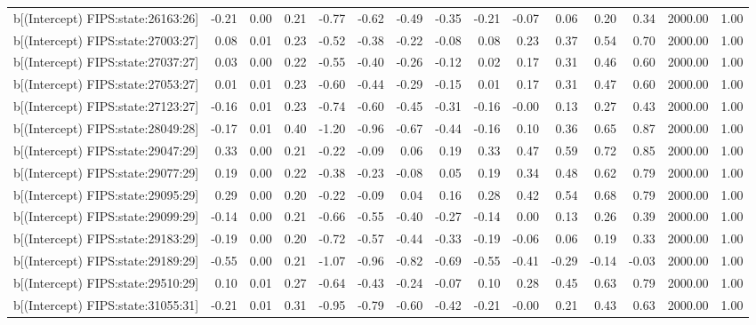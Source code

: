 \begin{table}[ht]
\begin{tabular}{rrrrrrrrrrrrrrr}
  b[(Intercept) FIPS:state:26163:26] & -0.21 & 0.00 & 0.21 & -0.77 & -0.62 & -0.49 & -0.35 & -0.21 & -0.07 & 0.06 & 0.20 & 0.34 & 2000.00 & 1.00 \\ 
  b[(Intercept) FIPS:state:27003:27] & 0.08 & 0.01 & 0.23 & -0.52 & -0.38 & -0.22 & -0.08 & 0.08 & 0.23 & 0.37 & 0.54 & 0.70 & 2000.00 & 1.00 \\ 
  b[(Intercept) FIPS:state:27037:27] & 0.03 & 0.00 & 0.22 & -0.55 & -0.40 & -0.26 & -0.12 & 0.02 & 0.17 & 0.31 & 0.46 & 0.60 & 2000.00 & 1.00 \\ 
  b[(Intercept) FIPS:state:27053:27] & 0.01 & 0.01 & 0.23 & -0.60 & -0.44 & -0.29 & -0.15 & 0.01 & 0.17 & 0.31 & 0.47 & 0.60 & 2000.00 & 1.00 \\ 
  b[(Intercept) FIPS:state:27123:27] & -0.16 & 0.01 & 0.23 & -0.74 & -0.60 & -0.45 & -0.31 & -0.16 & -0.00 & 0.13 & 0.27 & 0.43 & 2000.00 & 1.00 \\ 
  b[(Intercept) FIPS:state:28049:28] & -0.17 & 0.01 & 0.40 & -1.20 & -0.96 & -0.67 & -0.44 & -0.16 & 0.10 & 0.36 & 0.65 & 0.87 & 2000.00 & 1.00 \\ 
  b[(Intercept) FIPS:state:29047:29] & 0.33 & 0.00 & 0.21 & -0.22 & -0.09 & 0.06 & 0.19 & 0.33 & 0.47 & 0.59 & 0.72 & 0.85 & 2000.00 & 1.00 \\ 
  b[(Intercept) FIPS:state:29077:29] & 0.19 & 0.00 & 0.22 & -0.38 & -0.23 & -0.08 & 0.05 & 0.19 & 0.34 & 0.48 & 0.62 & 0.79 & 2000.00 & 1.00 \\ 
  b[(Intercept) FIPS:state:29095:29] & 0.29 & 0.00 & 0.20 & -0.22 & -0.09 & 0.04 & 0.16 & 0.28 & 0.42 & 0.54 & 0.68 & 0.79 & 2000.00 & 1.00 \\ 
  b[(Intercept) FIPS:state:29099:29] & -0.14 & 0.00 & 0.21 & -0.66 & -0.55 & -0.40 & -0.27 & -0.14 & 0.00 & 0.13 & 0.26 & 0.39 & 2000.00 & 1.00 \\ 
  b[(Intercept) FIPS:state:29183:29] & -0.19 & 0.00 & 0.20 & -0.72 & -0.57 & -0.44 & -0.33 & -0.19 & -0.06 & 0.06 & 0.19 & 0.33 & 2000.00 & 1.00 \\ 
  b[(Intercept) FIPS:state:29189:29] & -0.55 & 0.00 & 0.21 & -1.07 & -0.96 & -0.82 & -0.69 & -0.55 & -0.41 & -0.29 & -0.14 & -0.03 & 2000.00 & 1.00 \\ 
  b[(Intercept) FIPS:state:29510:29] & 0.10 & 0.01 & 0.27 & -0.64 & -0.43 & -0.24 & -0.07 & 0.10 & 0.28 & 0.45 & 0.63 & 0.79 & 2000.00 & 1.00 \\ 
  b[(Intercept) FIPS:state:31055:31] & -0.21 & 0.01 & 0.31 & -0.95 & -0.79 & -0.60 & -0.42 & -0.21 & -0.00 & 0.21 & 0.43 & 0.63 & 2000.00 & 1.00 \\ 

\end{tabular}
\end{table}
